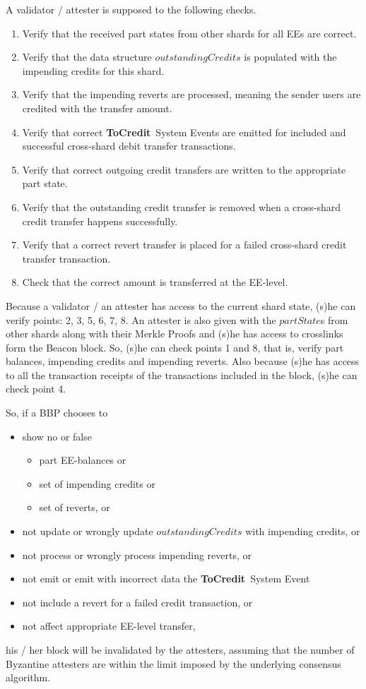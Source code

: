 \documentclass{IEEEtran}
\newcommand{\tocredit}[0]{{\bf ToCredit}~}
\begin{document}
A validator / attester is supposed to the following checks.
\begin{enumerate}
\item Verify that the received part states from other shards for all EEs are correct.
\item Verify that the data structure $outstandingCredits$ is populated with the impending credits for this shard.
\item Verify that the impending reverts are processed, meaning the sender users are credited with the transfer amount.
\item Verify that correct \tocredit System Events are emitted for included and successful cross-shard debit transfer transactions.
\item Verify that correct outgoing credit transfers are written to the appropriate part state.
\item Verify that the outstanding credit transfer is removed when a cross-shard credit transfer happens successfully.
\item Verify that a correct revert transfer is placed for a failed cross-shard credit transfer transaction.
\item Check that the correct amount is transferred at the EE-level.
\end{enumerate}

Because a validator / an attester has access to the current shard state, (s)he can verify points: 2, 3, 5, 6, 7, 8. An attester is also given with the $partState$s from other shards along with their Merkle Proofs and (s)he has access to crosslinks form the Beacon block. So, (s)he can check points 1 and 8, that is, verify part balances, impending credits and impending reverts. Also because (s)he has access to all the transaction receipts of the transactions included in the block, (s)he can check point 4.

So, if a BBP chooses to

\begin{itemize}
	\item show no or false 
	\begin{itemize}
		\item part EE-balances or
		\item set of impending credits or
		\item set of reverts, or
	\end{itemize}
	\item not update or wrongly update $outstandingCredits$ with impending credits, or
	\item not process or wrongly process impending reverts, or
	\item not emit or emit with incorrect data the \tocredit System Event
	\item not include a revert for a failed credit transaction, or
	\item not affect appropriate EE-level transfer,
\end{itemize}
his / her block will be invalidated by the attesters, assuming that the number of Byzantine attesters are within the limit imposed by the underlying consensus algorithm.
\end{document}
